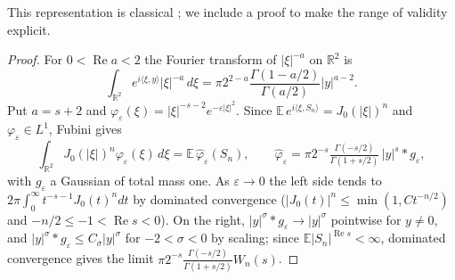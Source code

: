 \documentclass[11pt]{amsart}
\theoremstyle{definition}
\begin{document}
This representation is classical \cite[\S2]{BNSW11}; we include a proof to make the range of validity explicit.

\begin{proof}
For $0<\operatorname{Re}a<2$ the Fourier transform of $|\xi|^{-a}$ on $\mathbb R^2$ is
\[
\int_{\mathbb R^2}e^{i\langle\xi,y\rangle}|\xi|^{-a}\,d\xi=\pi2^{2-a}\frac{\Gamma(1-a/2)}{\Gamma(a/2)}|y|^{a-2}.
\]
Put $a=s+2$ and $\varphi_\varepsilon(\xi)=|\xi|^{-s-2}e^{-\varepsilon|\xi|^2}$. Since $\mathbb E\,e^{i\langle\xi,S_n\rangle}=J_0(|\xi|)^n$ and $\varphi_\varepsilon\in L^1$, Fubini gives
\[
\int_{\mathbb R^2}J_0(|\xi|)^n\varphi_\varepsilon(\xi)\,d\xi=\mathbb E\,\hat\varphi_\varepsilon(S_n),\qquad\hat\varphi_\varepsilon=\pi2^{-s}\tfrac{\Gamma(-s/2)}{\Gamma(1+s/2)}\,|y|^s*g_\varepsilon,
\]
with $g_\varepsilon$ a Gaussian of total mass one. As $\varepsilon\to0$ the left side tends to $2\pi\int_0^\infty t^{-s-1}J_0(t)^ndt$ by dominated convergence ($|J_0(t)|^n\le\min(1,Ct^{-n/2})$ and $-n/2\le-1<\operatorname{Re}s<0$). On the right, $|y|^\sigma*g_\varepsilon\to|y|^\sigma$ pointwise for $y\ne0$, and $|y|^\sigma*g_\varepsilon\le C_\sigma|y|^\sigma$ for $-2<\sigma<0$ by scaling; since $\mathbb E|S_n|^{\operatorname{Re}s}<\infty$, dominated convergence gives the limit $\pi2^{-s}\frac{\Gamma(-s/2)}{\Gamma(1+s/2)}W_n(s)$.
\end{proof}
\end{document}
